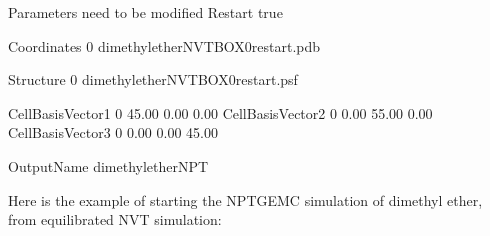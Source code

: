\documentclass[letterpaper,10pt,english]{sphinxmanual}
\begin{document}
\begin{sphinxVerbatim}[commandchars=\\\{\}]
\PYGZsh{}\PYGZsh{}\PYGZsh{}\PYGZsh{}\PYGZsh{}\PYGZsh{}\PYGZsh{}\PYGZsh{}\PYGZsh{}\PYGZsh{}\PYGZsh{}\PYGZsh{}\PYGZsh{}\PYGZsh{}\PYGZsh{}\PYGZsh{}\PYGZsh{}\PYGZsh{}\PYGZsh{}\PYGZsh{}\PYGZsh{}\PYGZsh{}\PYGZsh{}\PYGZsh{}\PYGZsh{}\PYGZsh{}\PYGZsh{}\PYGZsh{}\PYGZsh{}\PYGZsh{}\PYGZsh{}\PYGZsh{}\PYGZsh{}\PYGZsh{}\PYGZsh{}\PYGZsh{}\PYGZsh{}\PYGZsh{}\PYGZsh{}\PYGZsh{}\PYGZsh{}\PYGZsh{}\PYGZsh{}\PYGZsh{}\PYGZsh{}\PYGZsh{}\PYGZsh{}\PYGZsh{}\PYGZsh{}\PYGZsh{}\PYGZsh{}\PYGZsh{}\PYGZsh{}\PYGZsh{}\PYGZsh{}\PYGZsh{}
\PYGZsh{} Parameters need to be modified
\PYGZsh{}\PYGZsh{}\PYGZsh{}\PYGZsh{}\PYGZsh{}\PYGZsh{}\PYGZsh{}\PYGZsh{}\PYGZsh{}\PYGZsh{}\PYGZsh{}\PYGZsh{}\PYGZsh{}\PYGZsh{}\PYGZsh{}\PYGZsh{}\PYGZsh{}\PYGZsh{}\PYGZsh{}\PYGZsh{}\PYGZsh{}\PYGZsh{}\PYGZsh{}\PYGZsh{}\PYGZsh{}\PYGZsh{}\PYGZsh{}\PYGZsh{}\PYGZsh{}\PYGZsh{}\PYGZsh{}\PYGZsh{}\PYGZsh{}\PYGZsh{}\PYGZsh{}\PYGZsh{}\PYGZsh{}\PYGZsh{}\PYGZsh{}\PYGZsh{}\PYGZsh{}\PYGZsh{}\PYGZsh{}\PYGZsh{}\PYGZsh{}\PYGZsh{}\PYGZsh{}\PYGZsh{}\PYGZsh{}\PYGZsh{}\PYGZsh{}\PYGZsh{}\PYGZsh{}\PYGZsh{}\PYGZsh{}\PYGZsh{}
Restart         true

Coordinates     0   dimethylether\PYGZus{}NVT\PYGZus{}BOX\PYGZus{}0\PYGZus{}restart.pdb

Structure       0   dimethylether\PYGZus{}NVT\PYGZus{}BOX\PYGZus{}0\PYGZus{}restart.psf

\PYGZsh{}CellBasisVector1   0       45.00   0.00    0.00
\PYGZsh{}CellBasisVector2   0       0.00    55.00   0.00
\PYGZsh{}CellBasisVector3   0       0.00    0.00    45.00

OutputName          dimethylether\PYGZus{}NPT
\end{sphinxVerbatim}

\sphinxAtStartPar
Here is the example of starting the NPT\sphinxhyphen{}GEMC simulation of dimethyl ether, from equilibrated NVT simulation:
\end{document}
